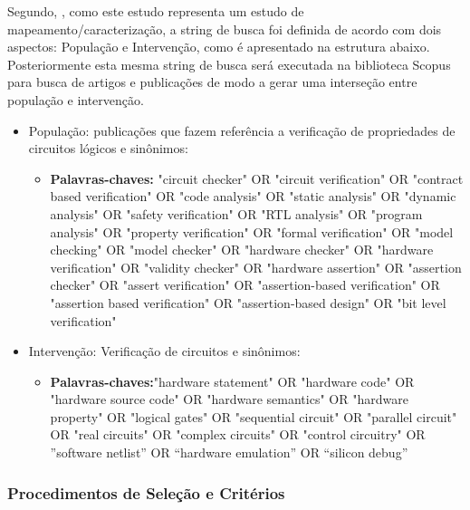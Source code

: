 Segundo, \cite{rocha2015verificaccao}, como este estudo representa um estudo de mapeamento/caracterização, a string de busca foi definida de acordo com dois aspectos: População e Intervenção, como é apresentado na estrutura abaixo. Posteriormente esta mesma string de busca será executada na biblioteca Scopus para busca de artigos e publicações de modo a gerar uma interseção entre população e intervenção.
\begin{itemize}
\item População: publicações que fazem referência a verificação de propriedades de circuitos lógicos e sinônimos:
	\begin{itemize}
	\item \textbf{Palavras-chaves:} "circuit checker" OR "circuit verification" OR "contract based verification" OR "code analysis" OR "static analysis" OR "dynamic analysis" OR "safety verification" OR "RTL analysis" OR "program analysis" OR "property verification" OR "formal verification" OR "model checking" OR "model checker" OR "hardware checker" OR "hardware verification" OR "validity checker" OR "hardware assertion" OR "assertion checker" OR "assert verification" OR "assertion-based verification" OR "assertion based verification" OR "assertion-based design" OR "bit level verification"
	\end{itemize}
\item Intervenção: Verificação de circuitos e sinônimos:
	\begin{itemize}
	\item \textbf{Palavras-chaves:}"hardware statement" OR "hardware code" OR "hardware source code" OR "hardware semantics" OR "hardware property" OR "logical gates" OR "sequential circuit" OR "parallel circuit" OR "real circuits" OR "complex circuits" OR "control circuitry" OR ”software netlist” OR “hardware emulation” OR “silicon debug”
	\end{itemize}
\end{itemize}
\subsubsection{Procedimentos de Seleção e Critérios}

